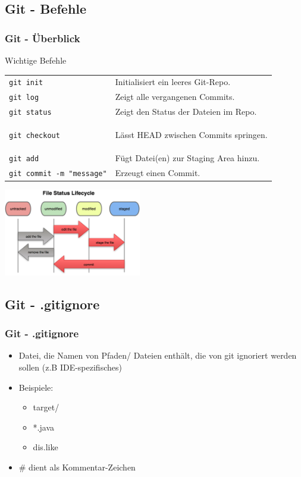\documentclass[18pt]{beamer}
\begin{document}
	\subsection{Git - Befehle}
	\begin{frame}
		\frametitle{Git - Überblick}
		\begin{block}{Wichtige Befehle}
			\begin{tabular}{ll}
				\texttt{git init} &  Initialisiert ein leeres Git-Repo.\\
				\texttt{git log} &  Zeigt alle vergangenen Commits.\\
				\texttt{git status} &  Zeigt den Status der Dateien im Repo.\\
				\texttt{git checkout} & \begin{small}
					Lässt HEAD zwischen Commits springen. 
				\end{small}\\
				\texttt{git add} &  Fügt Datei(en) zur Staging Area hinzu.\\
				\texttt{git commit -m "message"} &  Erzeugt einen Commit.\\ 
			\end{tabular}
		\end{block}
		\centering \includegraphics[width=60mm, scale=1.5]{./pics/tut0/git-file-lifecycle.png}
	\end{frame}

	\subsection{Git - .gitignore}
	\begin{frame}
		\frametitle{Git - .gitignore}
		\begin{itemize}
			\item Datei, die Namen von Pfaden/ Dateien enthält, die von git ignoriert werden sollen (z.B IDE-spezifisches)
			\item Beispiele: 
			\begin{itemize}
				\item target/
				\item *.java
				\item dis.like
			\end{itemize}
			\item \# dient als Kommentar-Zeichen
		\end{itemize}
	\end{frame}
	
\end{document}
